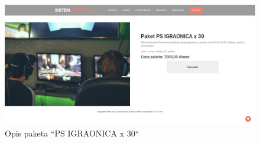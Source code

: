 \documentclass[../main.tex]{subfiles}
\begin{document}
\begin{figure}[!ht]
\begin{center}
\includegraphics[scale=0.22]{sections/korisnicki_interfejs/screenshots/ps_igraonica_30_termina.png}
\end{center}
\caption{Opis paketa ``PS IGRAONICA x 30``}
\label{fig:psx30}
\end{figure}
\end{document}
